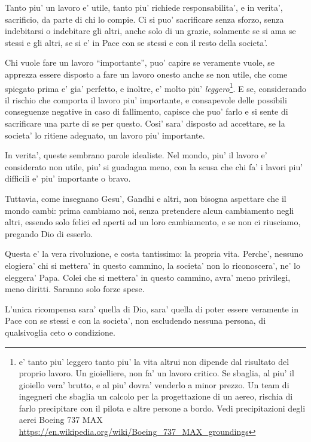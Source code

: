 Tanto piu' un lavoro e' utile, tanto piu' richiede responsabilita', e in verita', sacrificio, da parte di chi lo compie. Ci si puo' sacrificare senza sforzo, senza indebitarsi o indebitare gli altri, anche solo di un grazie, solamente se si ama se stessi e gli altri, se si e' in Pace con se stessi e con il resto della societa'.

Chi vuole fare un lavoro ``importante'', puo' capire se veramente vuole, se apprezza essere disposto a fare un lavoro onesto anche se non utile, che come spiegato prima e' gia' perfetto, e inoltre, e' molto piu' \emph{leggero}\footnote{e' tanto piu' leggero tanto piu' la vita altrui non dipende dal risultato del proprio lavoro. Un gioielliere, non fa' un lavoro critico. Se sbaglia, al piu' il gioiello vera' brutto, e al piu' dovra' venderlo a minor prezzo. Un team di ingegneri che sbaglia un calcolo per la progettazione di un aereo, rischia di farlo precipitare con il pilota e altre persone a bordo. Vedi precipitazioni degli aerei Boeing 737 MAX \url{https://en.wikipedia.org/wiki/Boeing\_737\_MAX\_groundings}}. 
E se, considerando il rischio che comporta il lavoro piu' importante, e consapevole delle possibili conseguenze negative in caso di fallimento, capisce che puo' farlo e si sente di sacrificare una parte di se per questo. Cosi' sara' disposto ad accettare, se la societa' lo ritiene adeguato, un lavoro piu' importante.

In verita', queste sembrano parole idealiste. Nel mondo, piu' il lavoro e' considerato non utile, piu' si guadagna meno, con la scusa che chi fa' i lavori piu' difficili e' piu' importante o bravo.

Tuttavia, come insegnano Gesu', Gandhi e altri, non bisogna aspettare che il mondo cambi: prima cambiamo noi, senza pretendere alcun cambiamento negli altri, essendo solo felici ed aperti ad un loro cambiamento, e se non ci riusciamo, pregando Dio di esserlo.

Questa e' la vera rivoluzione, e costa tantissimo: la propria vita. Perche', nessuno elogiera' chi si mettera' in questo cammino, la societa' non lo riconoscera', ne' lo eleggera' Papa. Colei che si mettera' in questo cammino, avra' meno privilegi, meno diritti. Saranno solo forze spese. 

L'unica ricompensa sara' quella di Dio, sara' quella di poter essere veramente in Pace con se stessi e con la societa', non escludendo nessuna persona, di qualsivoglia ceto o condizione.

